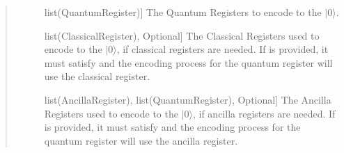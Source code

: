 \documentclass[letterpaper,10pt,english]{sphinxmanual}
\begin{document}
\begin{fulllineitems}
\begin{fulllineitems}
\begin{quote}
\begin{description}
\begin{description}
\item[{}] \leavevmode{[}list(QuantumRegister){]}
The Quantum Registers to encode to the \(|0\rangle\).

\item[{}] \leavevmode{[}list(ClassicalRegister), Optional{]}
The Classical Registers used to encode to the \(|0\rangle\), if classical registers are needed. If  is provided, it must satisfy  and the encoding process for the  quantum register will use the  classical register.

\item[{}] \leavevmode{[}list(AncillaRegister), list(QuantumRegister), Optional{]}
The Ancilla Registers used to encode to the \(|0\rangle\), if ancilla registers are needed. If  is provided, it must satisfy  and the encoding process for the  quantum register will use the  ancilla register.

\end{description}

\end{description}\end{quote}

\end{fulllineitems}


\end{fulllineitems}

\end{document}
